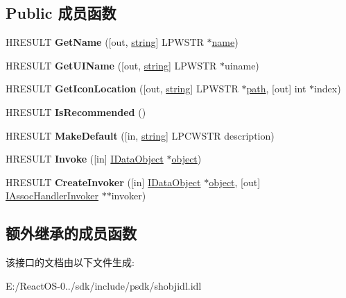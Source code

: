\subsection*{Public 成员函数}
\begin{DoxyCompactItemize}
\item 
\mbox{\label{interface_i_assoc_handler_a2785e083332216fae19b80c796755f26}} 
H\+R\+E\+S\+U\+LT {\bfseries Get\+Name} (\mbox{[}out, \hyperlink{structstring}{string}\mbox{]} L\+P\+W\+S\+TR $\ast$\hyperlink{structname}{name})
\item 
\mbox{\label{interface_i_assoc_handler_a4fefd69fd81388a46a86a91b20cfb014}} 
H\+R\+E\+S\+U\+LT {\bfseries Get\+U\+I\+Name} (\mbox{[}out, \hyperlink{structstring}{string}\mbox{]} L\+P\+W\+S\+TR $\ast$uiname)
\item 
\mbox{\label{interface_i_assoc_handler_a7823a02f01872b8ccf77fc29271835e4}} 
H\+R\+E\+S\+U\+LT {\bfseries Get\+Icon\+Location} (\mbox{[}out, \hyperlink{structstring}{string}\mbox{]} L\+P\+W\+S\+TR $\ast$\hyperlink{structpath}{path}, \mbox{[}out\mbox{]} int $\ast$index)
\item 
\mbox{\label{interface_i_assoc_handler_a96b576f0c4129d6dab09a299ff4e3f65}} 
H\+R\+E\+S\+U\+LT {\bfseries Is\+Recommended} ()
\item 
\mbox{\label{interface_i_assoc_handler_a8d4ab16c9c76febf654e42ce3766abae}} 
H\+R\+E\+S\+U\+LT {\bfseries Make\+Default} (\mbox{[}in, \hyperlink{structstring}{string}\mbox{]} L\+P\+C\+W\+S\+TR description)
\item 
\mbox{\label{interface_i_assoc_handler_a02b75c470bdfd48b29365c421f718d64}} 
H\+R\+E\+S\+U\+LT {\bfseries Invoke} (\mbox{[}in\mbox{]} \hyperlink{interface_i_data_object}{I\+Data\+Object} $\ast$\hyperlink{structobject}{object})
\item 
\mbox{\label{interface_i_assoc_handler_ae8c395f354ea04cbe80581b14344eb1b}} 
H\+R\+E\+S\+U\+LT {\bfseries Create\+Invoker} (\mbox{[}in\mbox{]} \hyperlink{interface_i_data_object}{I\+Data\+Object} $\ast$\hyperlink{structobject}{object}, \mbox{[}out\mbox{]} \hyperlink{interface_i_assoc_handler_invoker}{I\+Assoc\+Handler\+Invoker} $\ast$$\ast$invoker)
\end{DoxyCompactItemize}
\subsection*{额外继承的成员函数}


该接口的文档由以下文件生成\+:\begin{DoxyCompactItemize}
\item 
E\+:/\+React\+O\+S-\/0../sdk/include/psdk/shobjidl.\+idl\end{DoxyCompactItemize}
